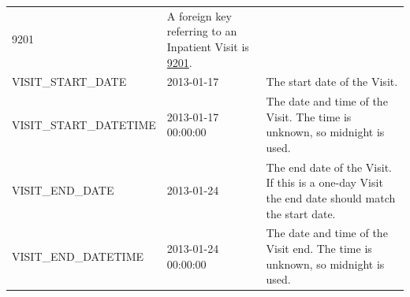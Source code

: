 \documentclass[11pt]{book}
\theoremstyle{definition}
\theoremstyle{definition}
\theoremstyle{definition}
\theoremstyle{remark}
\begin{document}
\begin{longtable}[]{@{}lll@{}}
\begin{minipage}[t]{0.15\columnwidth}
9201\strut
\end{minipage} & \begin{minipage}[t]{0.49\columnwidth}\raggedright
A foreign key referring to an Inpatient Visit is \href{http://athena.ohdsi.org/search-terms/terms/9201}{9201}.\strut
\end{minipage}\tabularnewline
\begin{minipage}[t]{0.28\columnwidth}\raggedright
VISIT\_START\_DATE\strut
\end{minipage} & \begin{minipage}[t]{0.15\columnwidth}\raggedright
2013-01-17\strut
\end{minipage} & \begin{minipage}[t]{0.49\columnwidth}\raggedright
The start date of the Visit.\strut
\end{minipage}\tabularnewline
\begin{minipage}[t]{0.28\columnwidth}\raggedright
VISIT\_START\_DATETIME\strut
\end{minipage} & \begin{minipage}[t]{0.15\columnwidth}\raggedright
2013-01-17 00:00:00\strut
\end{minipage} & \begin{minipage}[t]{0.49\columnwidth}\raggedright
The date and time of the Visit. The time is unknown, so midnight is used.\strut
\end{minipage}\tabularnewline
\begin{minipage}[t]{0.28\columnwidth}\raggedright
VISIT\_END\_DATE\strut
\end{minipage} & \begin{minipage}[t]{0.15\columnwidth}\raggedright
2013-01-24\strut
\end{minipage} & \begin{minipage}[t]{0.49\columnwidth}\raggedright
The end date of the Visit. If this is a one-day Visit the end date should match the start date.\strut
\end{minipage}\tabularnewline
\begin{minipage}[t]{0.28\columnwidth}\raggedright
VISIT\_END\_DATETIME\strut
\end{minipage} & \begin{minipage}[t]{0.15\columnwidth}\raggedright
2013-01-24 00:00:00\strut
\end{minipage} & \begin{minipage}[t]{0.49\columnwidth}\raggedright
The date and time of the Visit end. The time is unknown, so midnight is used.\strut
\end{minipage}\tabularnewline

\end{longtable}
\end{document}
